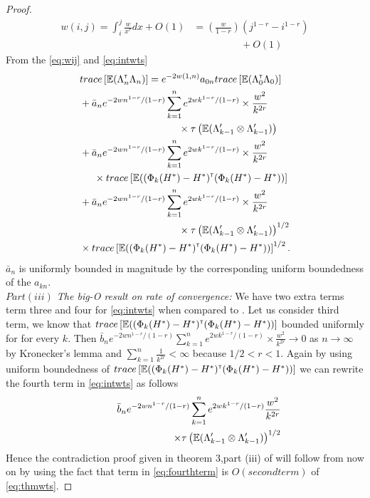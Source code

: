 \begin{proof}
\begin{align}\label{eq:intwts}
w(i,j) = \int_i^j \frac{w}{x^r} dx + O(1) &= \left(\frac{w}{1-r}\right)(j^{1-r}-i^{1-r})\nonumber\\ &\hspace{2cm}+O(1)
\end{align}
From the \eqref{eq:wij} and \eqref{eq:intwts}
\begin{align}\label{eq:thmwts}
 & trace \left[\E (\Lambda_n \tr \Lambda_n)\right] =  e^{-2 w(1,n)} a_{0n} trace \left[\E (\Lambda_0 \tr \Lambda_0)\right]  \nonumber\\ &+ \bar a_n e^{-2 w n^{1-r}/(1-r)} \sum_{k=1}^n e^{2 w k^{1-r}/(1-r)}  \times \frac{w^2}{k^{2 r}} \nonumber\\& \hspace{3.5cm} \times \tau\left(\E (\Lambda_{k-1}' \otimes \Lambda_{k-1}')\right)  \nonumber\\ &+ \bar a_n e^{-2 w n^{1-r}/(1-r)} \sum_{k=1}^n e^{2 w k^{1-r}/(1-r)}  \times \frac{w^2}{k^{2 r}}  \nonumber\\&  \hspace{0.5cm}\times trace\left[\E ((\Phi_k(H^*) - H^*) \tr  (\Phi_k(H^*) - H^*))\right] \nonumber\\ &+ \bar a_n e^{-2 w n^{1-r}/(1-r)} \sum_{k=1}^n e^{2 w k^{1-r}/(1-r)}  \times \frac{w^2}{k^{2 r}}  \nonumber\\&\hspace{3.5cm}\times \tau\left(\E (\Lambda_{k-1}' \otimes \Lambda_{k-1}')\right)^{1/2}\nonumber\\&\times trace\left[\E ((\Phi_k(H^*) - H^*) \tr  (\Phi_k(H^*) - H^*))\right]^{1/2}.
\end{align} $\bar a_n$ is uniformly bounded in magnitude by the corresponding uniform boundedness of the $a_{kn}$.\\
\emph{$Part(iii)$ The big-O result on rate of convergence:}
 We have two extra terms term three and four for \eqref{eq:intwts} when compared to \cite{spall-jacobian}. Let us consider third term, we know that $trace\left[\mathbb{E} ((\Phi_k(H^*) - H^*) ^\mathsf{\scriptscriptstyle T}  (\Phi_k(H^*) - H^*))\right]$ bounded uniformly for for every $k$. Then  $\bar b_n e^{-2 w n^{1-r}/(1-r)} \sum_{k=1}^n e^{2 w k^{1-r}/(1-r)}  \times \frac{w^2}{k^{2 r}} \to 0$ as $n \to \infty$ by Kronecker's lemma and $\sum_{k=1}^n \frac{1}{k^{2 r}} < \infty$ because $1/2 < r < 1$.  Again by using uniform boundedness of $trace\left[\mathbb{E} ((\Phi_k(H^*) - H^*) ^\mathsf{\scriptscriptstyle T}  (\Phi_k(H^*) - H^*))\right]$ we can rewrite  the fourth term in \eqref{eq:intwts} as follows 
 \begin{align}\label{eq:fourthterm}
 \bar b_n e^{-2 w n^{1-r}/(1-r)} \sum_{k=1}^n e^{2 w k^{1-r}/(1-r)}  \frac{w^2}{k^{2 r}} \nonumber \\ \hspace{3cm}\times \tau\left(\E (\Lambda_{k-1}' \otimes \Lambda_{k-1}')\right)^{1/2}
 \end{align}
 Hence the contradiction proof given in theorem 3,part (iii) of \cite{spall-jacobian} will follow from now on by using the fact that term in \eqref{eq:fourthterm} is $O(second term)$ of \eqref{eq:thmwts}. 
\end{proof}
